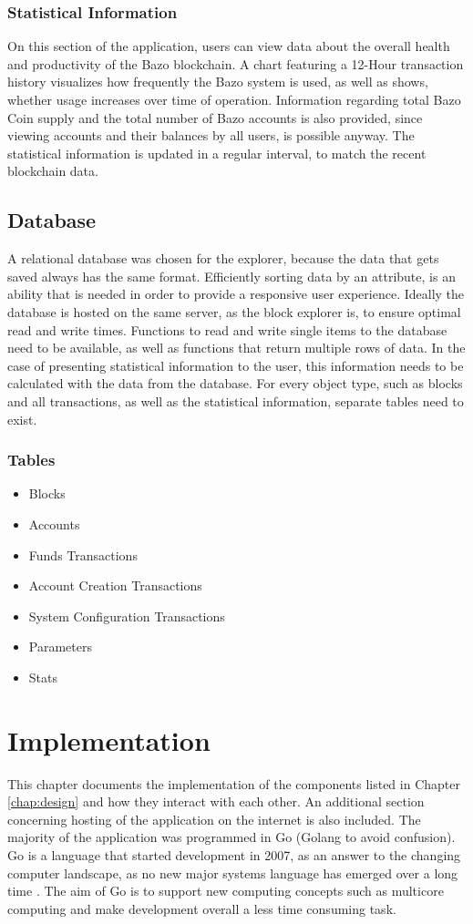 \subsection{Statistical Information}
On this section of the application, users can view data about the overall health and productivity of the Bazo blockchain. A chart featuring a 12-Hour transaction history visualizes how frequently the Bazo system is used, as well as shows, whether usage increases over time of operation. Information regarding total Bazo Coin supply and the total number of Bazo accounts is also provided, since viewing accounts and their balances by all users, is possible anyway. The statistical information is updated in a regular interval, to match the recent blockchain data.

\section{Database}
A relational database was chosen for the explorer, because the data that gets saved always has the same format. Efficiently sorting data by an attribute, is an ability that is needed in order to provide a responsive user experience. Ideally the database is hosted on the same server, as the block explorer is, to ensure optimal read and write times. Functions to read and write single items to the database need to be available, as well as functions that return multiple rows of data. In the case of presenting statistical information to the user, this information needs to be calculated with the data from the database. For every object type, such as blocks and all transactions, as well as the statistical information, separate tables need to exist. 
\subsection{Tables}
\begin{itemize}
\item{Blocks}
\item{Accounts}
\item{Funds Transactions}
\item{Account Creation Transactions}
\item{System Configuration Transactions}
\item{Parameters}
\item{Stats}
\end{itemize}

\chapter{Implementation}
This chapter documents the implementation of the components listed in Chapter \ref{chap:design} and how they interact with each other. An additional section concerning hosting of the application on the internet is also included. The majority of the application was programmed in Go (Golang to avoid confusion). Go is a language that started development in 2007, as an answer to the changing computer landscape, as no new major systems language has emerged over a long time \cite{gohistory}. The aim of Go is to support new computing concepts such as multicore computing and make development overall a less time consuming task.
